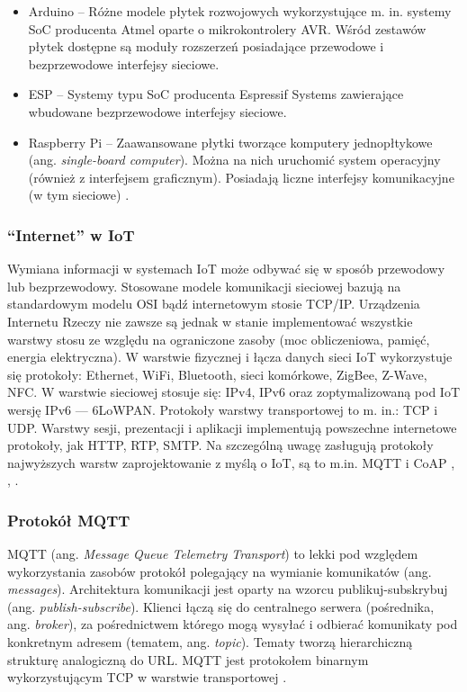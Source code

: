 \documentclass[a4paper, 12pt, twoside]{article}
\begin{document}
\begin{itemize}
    \item Arduino -- Różne modele płytek rozwojowych wykorzystujące m. in. systemy
    SoC producenta Atmel oparte o mikrokontrolery AVR. Wśród zestawów płytek
    dostępne są moduły rozszerzeń posiadające przewodowe i bezprzewodowe interfejsy sieciowe.
    \item ESP -- Systemy typu SoC producenta Espressif Systems zawierające wbudowane
    bezprzewodowe interfejsy sieciowe.
    \item Raspberry Pi -- Zaawansowane płytki tworzące komputery jednopłtykowe (ang. \emph{single-board computer}).    
    Można na nich uruchomić system operacyjny (również z interfejsem graficznym). Posiadają liczne 
    interfejsy komunikacyjne (w tym sieciowe) \cite{rpi}. 
\end{itemize}

\subsubsection{``Internet'' w IoT}

Wymiana informacji w systemach IoT może odbywać się w sposób przewodowy lub bezprzewodowy.
Stosowane modele komunikacji sieciowej bazują na standardowym modelu OSI bądź
internetowym stosie TCP/IP. Urządzenia Internetu Rzeczy nie zawsze są jednak 
w stanie implementować wszystkie warstwy stosu ze względu na ograniczone zasoby 
(moc obliczeniowa, pamięć, energia elektryczna). W warstwie fizycznej i łącza danych
sieci IoT wykorzystuje się protokoły: Ethernet, WiFi, Bluetooth, sieci komórkowe,
ZigBee, Z-Wave, NFC. W warstwie sieciowej stosuje się: IPv4, IPv6 oraz zoptymalizowaną
pod IoT wersję IPv6 --- 6LoWPAN. Protokoły warstwy transportowej to m. in.: TCP i UDP. 
Warstwy sesji, prezentacji i aplikacji implementują powszechne internetowe protokoły, jak
HTTP, RTP, SMTP. Na szczególną uwagę zasługują protokoły najwyższych warstw zaprojektowanie
z myślą o IoT, są to m.in. MQTT i CoAP \cite{internet-reczy}, \cite{intro-to-iot}, \cite{iot-hype-to-reality}.

\subsubsection*{Protokół MQTT}

MQTT (ang. \emph{Message Queue Telemetry Transport}) to lekki pod względem wykorzystania zasobów
protokół polegający na wymianie komunikatów (ang. \emph{messages}). Architektura komunikacji
jest oparty na wzorcu publikuj-subskrybuj (ang. \emph{publish-subscribe}).
Klienci łączą się do centralnego serwera (pośrednika, ang. \emph{broker}), za pośrednictwem
którego mogą wysyłać i odbierać komunikaty pod konkretnym adresem (tematem, ang. \emph{topic}).
Tematy tworzą hierarchiczną strukturę analogiczną do URL. MQTT jest protokołem binarnym
wykorzystującym TCP w warstwie transportowej \cite{iot-hype-to-reality}.
\end{document}
